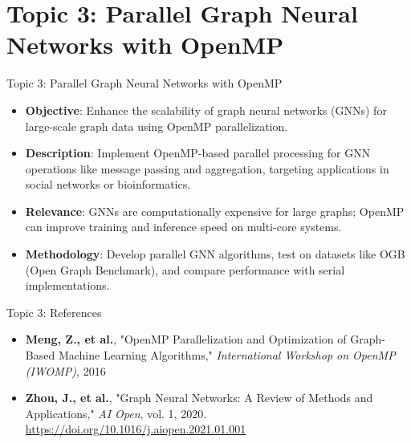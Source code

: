 \documentclass{beamer}
\begin{document}
\section{Topic 3: Parallel Graph Neural Networks with OpenMP}
\begin{frame}{Topic 3: Parallel Graph Neural Networks with OpenMP}
\begin{itemize}
    \item \textbf{Objective}: Enhance the scalability of graph neural networks (GNNs) for large-scale graph data using OpenMP parallelization.
    \item \textbf{Description}: Implement OpenMP-based parallel processing for GNN operations like message passing and aggregation, targeting applications in social networks or bioinformatics.
    \item \textbf{Relevance}: GNNs are computationally expensive for large graphs; OpenMP can improve training and inference speed on multi-core systems.
    \item \textbf{Methodology}: Develop parallel GNN algorithms, test on datasets like OGB (Open Graph Benchmark), and compare performance with serial implementations.
\end{itemize}
\end{frame}

\begin{frame}{Topic 3: References}
\begin{itemize}
    \item \textbf{Meng, Z., et al.}, "OpenMP Parallelization and Optimization of Graph-Based Machine Learning Algorithms," \textit{International Workshop on OpenMP (IWOMP)}, 2016
    \item \textbf{Zhou, J., et al.}, "Graph Neural Networks: A Review of Methods and Applications," \textit{AI Open}, vol. 1, 2020. \url{https://doi.org/10.1016/j.aiopen.2021.01.001}
\end{itemize}
\end{frame}
\end{document}
